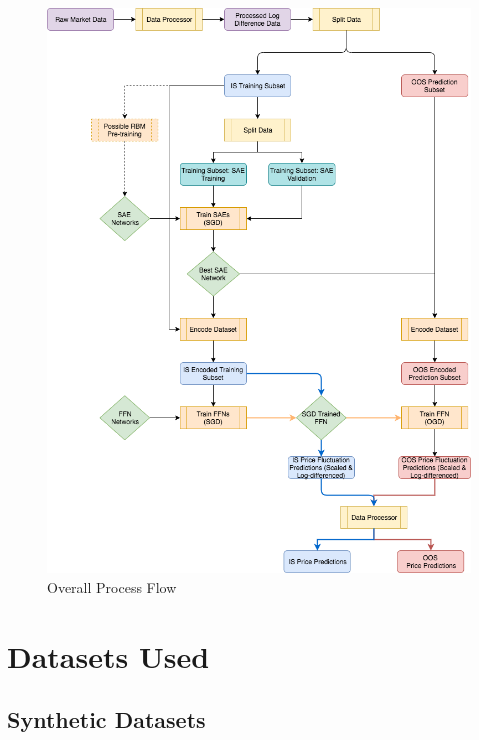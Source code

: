\documentclass[a4paper,11pt,oneside]{article}
\theoremstyle{plain}
\theoremstyle{definition}
\begin{document}
\begin{figure}[H]
	\centering \includegraphics[scale=0.5]{images/process_implementation/process_flow.png}
	\caption{Overall Process Flow}
	\label{figure-proc_diagram}
\end{figure}






















\newpage
\section{Datasets Used}\label{Datasets}

\subsection{Synthetic Datasets}
\end{document}

